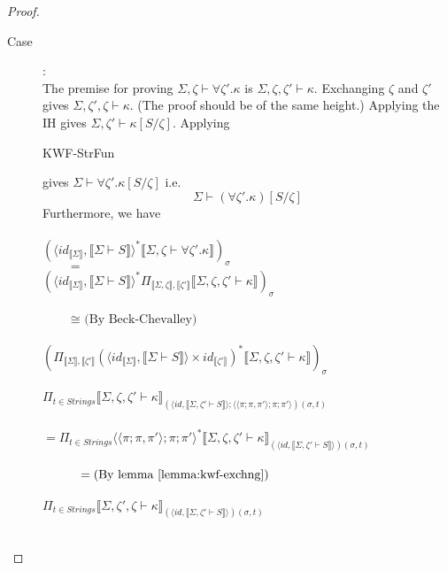 \documentclass{article}
\newcommand{\sem}[1]{\llbracket #1 \rrbracket}
\begin{document}
\begin{proof}
\begin{description}
\item[Case ]:~\\
The premise for proving $\Sigma,\zeta \vdash \forall \zeta'.\kappa$ is $\Sigma,\zeta,\zeta' \vdash \kappa$. Exchanging $\zeta$ and $\zeta'$ gives $\Sigma,\zeta',\zeta \vdash \kappa$. (The proof should be of the same height.) Applying the IH gives $\Sigma,\zeta' \vdash \kappa[S/\zeta]$. Applying \begin{sc}KWF-StrFun\end{sc} gives $\Sigma \vdash \forall \zeta'. \kappa[S/\zeta]$ i.e.
$$\Sigma \vdash (\forall \zeta'. \kappa)[S/\zeta]$$
Furthermore, we have\\~\\
$(\langle \mathit{id}_{\sem{\Sigma}}, \sem{\Sigma \vdash S} \rangle^* \sem{\Sigma,\zeta \vdash \forall \zeta'. \kappa})_\sigma$\\
$~~~~~~~~~=$\\
$(\langle \mathit{id}_{\sem{\Sigma}}, \sem{\Sigma \vdash S} \rangle^* \Pi_{\sem{\Sigma,\zeta},\sem{\zeta'}} \sem{\Sigma,\zeta,\zeta' \vdash \kappa})_\sigma$\\~\\
$~~~~~~~~~\cong \text{ (By Beck-Chevalley)}$\\~\\
$(\Pi_{\sem{\Sigma},\sem{\zeta'}} (\langle \mathit{id}_{\sem{\Sigma}}, \sem{\Sigma \vdash S} \rangle \times \mathit{id}_{\sem{\zeta'}})^* \sem{\Sigma, \zeta, \zeta' \vdash \kappa})_\sigma$\\~\\
$\Pi_{t \in \mathit{Strings}} \sem{\Sigma,\zeta,\zeta' \vdash \kappa}_{(\langle \mathit{id}, \sem{\Sigma,\zeta' \vdash S} \rangle; \langle \langle \pi;\pi,\pi' \rangle;\pi;\pi' \rangle)(\sigma, t)}$\\~\\ 
$= \Pi_{t \in \mathit{Strings}} \langle \langle \pi;\pi,\pi' \rangle;\pi;\pi' \rangle^* \sem{\Sigma,\zeta,\zeta' \vdash \kappa}_{(\langle \mathit{id}, \sem{\Sigma,\zeta' \vdash S} \rangle)(\sigma, t)}$\\~\\
$~~~~~~~~~ = \text{(By lemma } \ref{lemma:kwf-exchng})$\\~\\
$\Pi_{t \in \mathit{Strings}} \sem{\Sigma,\zeta',\zeta \vdash \kappa}_{(\langle \mathit{id}, \sem{\Sigma,\zeta' \vdash S} \rangle)(\sigma, t)}$\\~\\



\end{description}
\end{proof}
\end{document}
